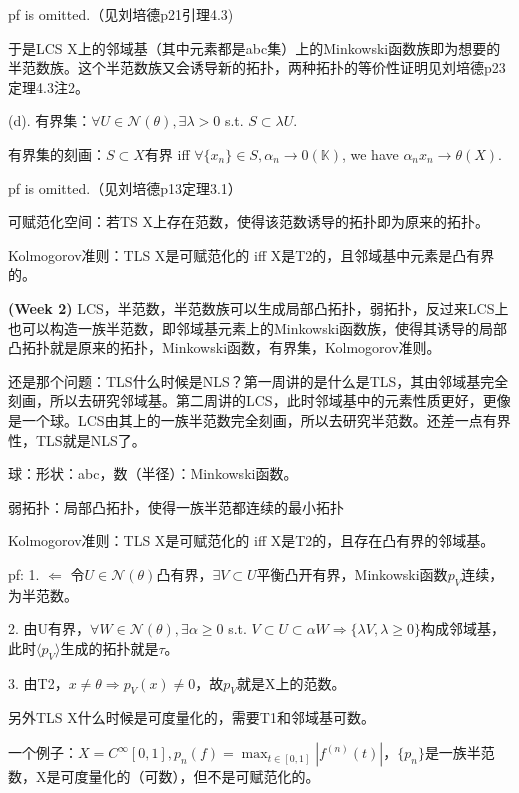 pf is omitted.（见刘培德p21引理4.3)

于是LCS X上的邻域基（其中元素都是abc集）上的Minkowski函数族即为想要的半范数族。这个半范数族又会诱导新的拓扑，两种拓扑的等价性证明见刘培德p23定理4.3注2。

(d). 有界集：$\forall U \in \mathcal{N}(\theta), \exists \lambda > 0$ s.t. $S \subset \lambda U$.

有界集的刻画：$S \subset X$有界 iff $\forall \{x_n\} \in S, \alpha_n \to 0(\mathbb{K})$, we have $\alpha_n x_n \to \theta(X)$.

pf is omitted.（见刘培德p13定理3.1）

可赋范化空间：若TS X上存在范数，使得该范数诱导的拓扑即为原来的拓扑。

Kolmogorov准则：TLS X是可赋范化的 iff X是T2的，且邻域基中元素是凸有界的。

\begin{conc}
  \textbf{(Week 2)} LCS，半范数，半范数族可以生成局部凸拓扑，弱拓扑，反过来LCS上也可以构造一族半范数，即邻域基元素上的Minkowski函数族，使得其诱导的局部凸拓扑就是原来的拓扑，Minkowski函数，有界集，Kolmogorov准则。

  还是那个问题：TLS什么时候是NLS？第一周讲的是什么是TLS，其由邻域基完全刻画，所以去研究邻域基。第二周讲的LCS，此时邻域基中的元素性质更好，更像是一个球。LCS由其上的一族半范数完全刻画，所以去研究半范数。还差一点有界性，TLS就是NLS了。
\end{conc}

球：形状：abc，数（半径）：Minkowski函数。

弱拓扑：局部凸拓扑，使得一族半范都连续的最小拓扑

Kolmogorov准则：TLS X是可赋范化的 iff X是T2的，且存在凸有界的邻域基。

pf: 1. $\Leftarrow$ 令$U \in \mathcal{N}(\theta)$凸有界，$\exists V \subset U$平衡凸开有界，Minkowski函数$p_V$连续，为半范数。

2. 由U有界，$\forall W \in \mathcal{N}(\theta), \exists \alpha \ge 0$ s.t. $V \subset U \subset \alpha W \Rightarrow \{ \lambda V, \lambda \ge 0 \}$构成邻域基，此时$\langle p_V \rangle$生成的拓扑就是$\tau$。

3. 由T2，$x \neq \theta \Rightarrow p_V(x) \neq 0$，故$p_V$就是X上的范数。

另外TLS X什么时候是可度量化的，需要T1和邻域基可数。

一个例子：$X = C^{\infty}[0, 1], p_{n}(f) = \max_{t \in [0, 1]} |f^{(n)}(t)|$，$\{p_{n}\}$是一族半范数，X是可度量化的（可数），但不是可赋范化的。

